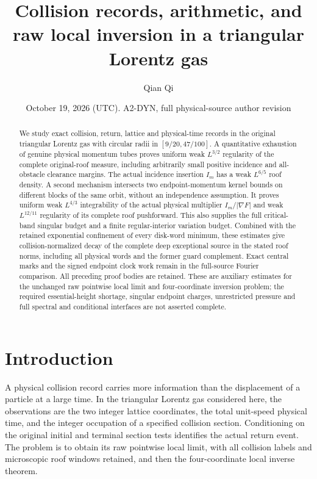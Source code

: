 \documentclass[11pt,reqno]{amsart}
\title[Collision records and raw local inversion]{Collision records, arithmetic, and raw local inversion in a triangular Lorentz gas}
\author{Qian Qi}
\date{October 19, 2026 (UTC). A2-DYN, full physical-source author revision}
\numberwithin{equation}{section}
\theoremstyle{definition}\newtheorem{definition}[theorem]{Definition}
\theoremstyle{remark}\newtheorem{remark}[theorem]{Remark}
\begin{document}
\raggedbottom
\begin{abstract}
We study exact collision, return, lattice and physical-time records in the
original triangular Lorentz gas with circular radii in $[9/20,47/100]$.
A quantitative exhaustion of genuine physical momentum tubes proves
uniform weak $L^{3/2}$ regularity of the complete original-roof measure,
including arbitrarily small positive incidence and all-obstacle clearance
margins. The actual incidence insertion $I_m$ has a weak $L^{6/5}$
roof density. A second mechanism intersects two endpoint-momentum kernel
bounds on different blocks of the same orbit, without an independence
assumption. It proves uniform weak $L^{4/3}$ integrability of the actual
physical multiplier $I_m/|\nabla F|$ and weak $L^{12/11}$ regularity of
its complete roof pushforward. This also supplies the full critical-band
singular budget and a finite regular-interior variation budget.
Combined with the retained exponential confinement of every disk-word
minimum, these estimates give collision-normalized decay of the complete
deep exceptional source in the stated roof norms, including all physical
words and the former guard complement. Exact central marks and the signed
endpoint clock work remain in the full-source Fourier comparison.
All preceding proof bodies are retained. These are auxiliary estimates
for the unchanged raw pointwise local limit and four-coordinate inversion
problem; the required essential-height shortage, singular endpoint
charges, unrestricted pressure and full spectral and conditional
interfaces are not asserted complete.
\end{abstract}
\maketitle
\enlargethispage{6pt}

\section*{Introduction}
A physical collision record carries more information than the
displacement of a particle at a large time.  In the triangular
Lorentz gas considered here, the observations are the two integer
lattice coordinates, the total unit-speed physical time, and the
integer occupation of a specified collision section.  Conditioning
on the original initial and terminal section tests identifies the
actual return event.  The problem is to obtain its raw pointwise
local limit, with all collision labels and microscopic roof windows
retained, and then the four-coordinate local inverse theorem.
\end{document}
